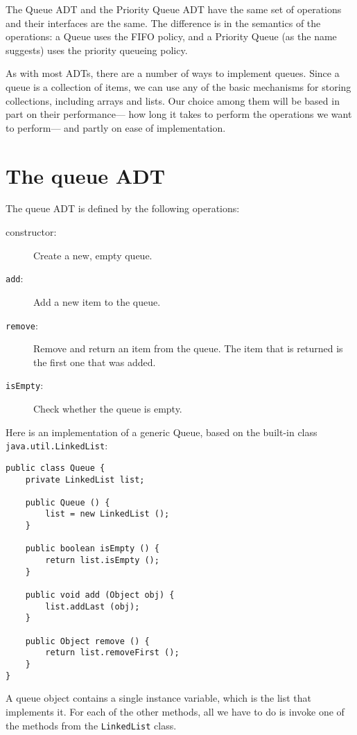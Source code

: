 The Queue ADT and the Priority Queue ADT have the same set
of operations and their interfaces are the same.  The difference
is in the semantics of the operations: a Queue uses the FIFO
policy, and a Priority Queue (as the name suggests) uses the
priority queueing policy.

As with most ADTs, there are a number of ways to implement queues.
Since a queue is a collection of items, we can use any of the basic
mechanisms for storing collections, including arrays and lists.
Our choice among them will be based in part on their performance---
how long it takes to perform the operations we want to perform---
and partly on ease of implementation.



\section{The queue ADT}

The queue ADT is defined by the following operations:

\begin{description}

\item[constructor:] Create a new, empty queue.

\item[{\tt add}:] Add a new item to the queue.

\item[{\tt remove}:] Remove and return an item from the queue.  The item
that is returned is the first one that was added.

\item[{\tt isEmpty}:] Check whether the queue is empty.

\end{description}

Here is an implementation of a generic Queue, based on the
built-in class {\tt java.util.LinkedList}:

\begin{verbatim}
public class Queue {
    private LinkedList list;

    public Queue () {
        list = new LinkedList ();
    }

    public boolean isEmpty () {
        return list.isEmpty ();
    }

    public void add (Object obj) {
        list.addLast (obj);
    }

    public Object remove () {
        return list.removeFirst ();
    }
}
\end{verbatim}
%
A queue object contains a single instance variable, which is
the list that implements it.  For each of the other methods,
all we have to do is invoke one of the methods from the
{\tt LinkedList} class.

